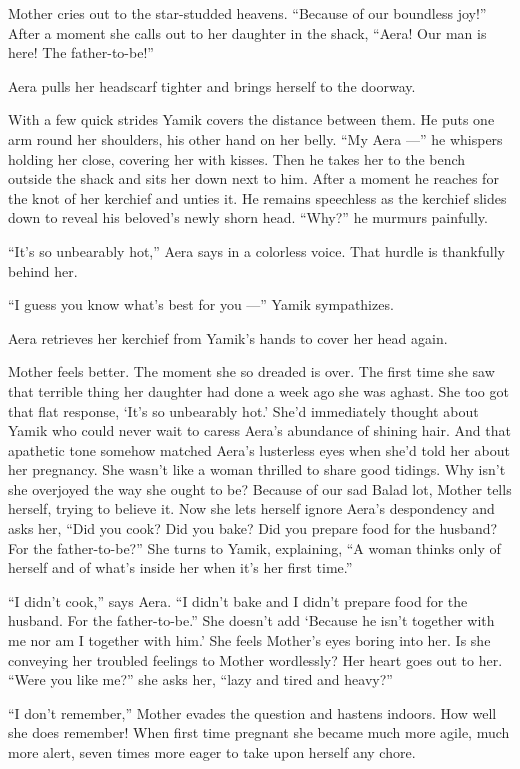 \documentclass[twoside,11pt,openany]{book}
\begin{document}
Mother cries out to the star-studded heavens. ``Because of our boundless joy!'' After a
moment she calls out to her daughter in the shack, ``Aera! Our man is here! The
father-to-be!''

Aera pulls her headscarf tighter and brings herself to the doorway.

With a few quick strides Yamik covers the distance between them. He puts one arm round her shoulders, his other hand on
her belly. ``My Aera ---'' he whispers holding her close, covering her with kisses. Then he
takes her to the bench outside the shack and sits her down next to him. After a moment he reaches for the knot of her kerchief
and unties it. He remains speechless as the kerchief slides down to reveal his beloved's newly shorn head.
``Why?'' he murmurs painfully.

``It's so unbearably hot,'' Aera says in a colorless voice. That hurdle is thankfully behind
her.

``I guess you know what's best for you ---'' Yamik sympathizes.

Aera retrieves her kerchief from Yamik's hands to cover her head again.

Mother feels better. The moment she so dreaded is over. The first time she saw that terrible thing her daughter had done
a week ago she was aghast. She too got that flat response, `It's so unbearably hot.' She'd immediately thought about
Yamik who could never wait to caress Aera's abundance of shining hair. And that apathetic tone somehow matched Aera's
lusterless eyes when she'd told her about her pregnancy. She wasn't like a woman thrilled to share good tidings. Why
isn't she overjoyed the way she ought to be? Because of our sad Balad lot, Mother tells herself, trying to believe it.
 Now she lets herself ignore Aera's despondency and asks her, ``Did you cook? Did you bake? Did you
prepare food for the husband? For the father-to-be?'' She turns to Yamik, explaining, ``A
woman thinks only of herself and of what's inside her when it's her first time.''

``I didn't cook,'' says Aera. ``I didn't bake and I didn't prepare food for the
husband. For the father-to-be.'' She doesn't add `Because he isn't together with me nor am I together with
him.' She feels Mother's eyes boring into her. Is she conveying her troubled feelings to Mother wordlessly? Her
heart goes out to her. ``Were you like me?'' she asks her, ``lazy and tired and heavy?''

``I don't remember,'' Mother evades the question and hastens indoors. How well she does
remember! When first time pregnant she became much more agile, much more alert, seven times more eager to take upon
herself any chore.
\end{document}
